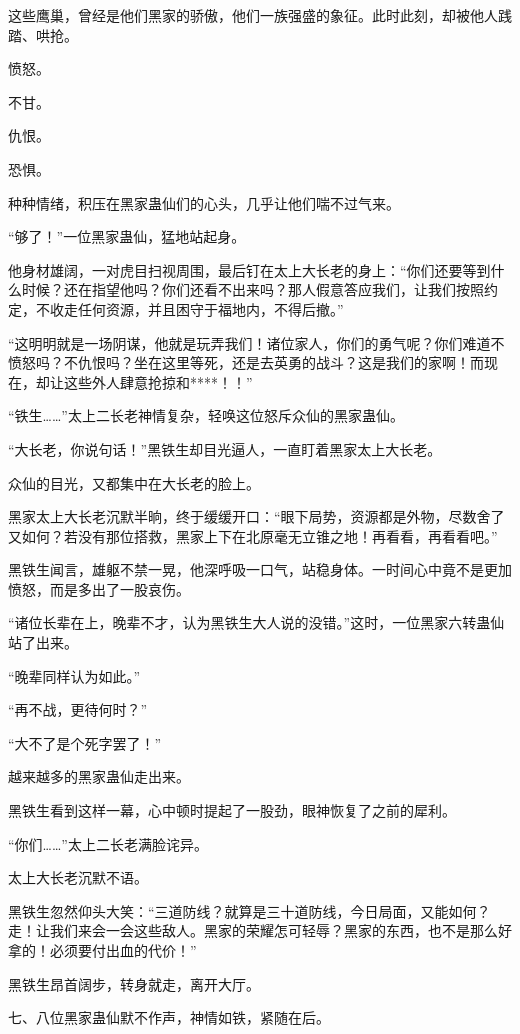 \begin{this_body}
这些鹰巢，曾经是他们黑家的骄傲，他们一族强盛的象征。此时此刻，却被他人践踏、哄抢。

愤怒。

不甘。

仇恨。

恐惧。

种种情绪，积压在黑家蛊仙们的心头，几乎让他们喘不过气来。

“够了！”一位黑家蛊仙，猛地站起身。

他身材雄阔，一对虎目扫视周围，最后钉在太上大长老的身上：“你们还要等到什么时候？还在指望他吗？你们还看不出来吗？那人假意答应我们，让我们按照约定，不收走任何资源，并且困守于福地内，不得后撤。”

“这明明就是一场阴谋，他就是玩弄我们！诸位家人，你们的勇气呢？你们难道不愤怒吗？不仇恨吗？坐在这里等死，还是去英勇的战斗？这是我们的家啊！而现在，却让这些外人肆意抢掠和****！！”

“铁生……”太上二长老神情复杂，轻唤这位怒斥众仙的黑家蛊仙。

“大长老，你说句话！”黑铁生却目光逼人，一直盯着黑家太上大长老。

众仙的目光，又都集中在大长老的脸上。

黑家太上大长老沉默半晌，终于缓缓开口：“眼下局势，资源都是外物，尽数舍了又如何？若没有那位搭救，黑家上下在北原毫无立锥之地！再看看，再看看吧。”

黑铁生闻言，雄躯不禁一晃，他深呼吸一口气，站稳身体。一时间心中竟不是更加愤怒，而是多出了一股哀伤。

“诸位长辈在上，晚辈不才，认为黑铁生大人说的没错。”这时，一位黑家六转蛊仙站了出来。

“晚辈同样认为如此。”

“再不战，更待何时？”

“大不了是个死字罢了！”

越来越多的黑家蛊仙走出来。

黑铁生看到这样一幕，心中顿时提起了一股劲，眼神恢复了之前的犀利。

“你们……”太上二长老满脸诧异。

太上大长老沉默不语。

黑铁生忽然仰头大笑：“三道防线？就算是三十道防线，今日局面，又能如何？走！让我们来会一会这些敌人。黑家的荣耀怎可轻辱？黑家的东西，也不是那么好拿的！必须要付出血的代价！”

黑铁生昂首阔步，转身就走，离开大厅。

七、八位黑家蛊仙默不作声，神情如铁，紧随在后。


\end{this_body}
